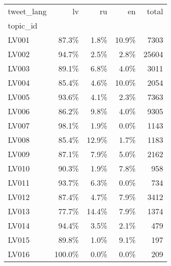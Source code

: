 \begin{tabular}{lrrrr}
\toprule
tweet\_lang &     lv &    ru &    en &  total \\
topic\_id &        &       &       &        \\
\midrule
LV001    &  87.3\% &  1.8\% & 10.9\% &   7303 \\
LV002    &  94.7\% &  2.5\% &  2.8\% &  25604 \\
LV003    &  89.1\% &  6.8\% &  4.0\% &   3011 \\
LV004    &  85.4\% &  4.6\% & 10.0\% &   2054 \\
LV005    &  93.6\% &  4.1\% &  2.3\% &   7363 \\
LV006    &  86.2\% &  9.8\% &  4.0\% &   9305 \\
LV007    &  98.1\% &  1.9\% &  0.0\% &   1143 \\
LV008    &  85.4\% & 12.9\% &  1.7\% &   1183 \\
LV009    &  87.1\% &  7.9\% &  5.0\% &   2162 \\
LV010    &  90.3\% &  1.9\% &  7.8\% &    958 \\
LV011    &  93.7\% &  6.3\% &  0.0\% &    734 \\
LV012    &  87.4\% &  4.7\% &  7.9\% &   3412 \\
LV013    &  77.7\% & 14.4\% &  7.9\% &   1374 \\
LV014    &  94.4\% &  3.5\% &  2.1\% &    479 \\
LV015    &  89.8\% &  1.0\% &  9.1\% &    197 \\
LV016    & 100.0\% &  0.0\% &  0.0\% &    209 \\
\bottomrule
\end{tabular}

